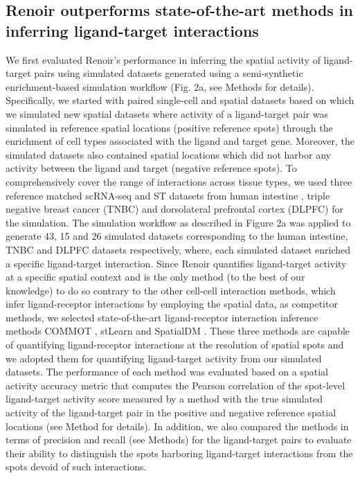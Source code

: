 \subsection*{Renoir outperforms state-of-the-art methods in inferring ligand-target interactions}
We first evaluated Renoir's performance in inferring the spatial activity of ligand-target pairs using simulated datasets generated using a semi-synthetic enrichment-based simulation workflow (Fig. 2a, see Methods for details). Specifically, we started with paired single-cell and spatial datasets based on which we simulated new spatial datasets where activity of a ligand-target pair was simulated in reference spatial locations (positive reference spots) through the enrichment of cell types associated with the ligand and target gene. Moreover, the simulated datasets also contained spatial locations which did not harbor any activity between the ligand and target (negative reference spots). To comprehensively cover the range of interactions across tissue types, we used three reference matched scRNA-seq and ST datasets from human intestine \citep{FAWKNERCORBETT2021810}, triple negative breast cancer (TNBC) \citep{Wu2021} and dorsolateral prefrontal cortex (DLPFC) \citep{Maynard2021} for the simulation. The simulation workflow as described in Figure 2a was applied to generate 43, 15 and 26 simulated datasets corresponding to the human intestine, TNBC and DLPFC datasets respectively, where, each simulated dataset enriched a specific ligand-target interaction. Since Renoir quantifies ligand-target activity at a specific spatial context and is the only method (to the best of our knowledge) to do so contrary to the other cell-cell interaction methods, which infer ligand-receptor interactions by employing the spatial data, as competitor methods, we selected state-of-the-art ligand-receptor interaction inference methods COMMOT \citep{Cang2023}, stLearn \citep{Pham2023} and SpatialDM \citep{Li2023}. These three methods are capable of quantifying ligand-receptor interactions at the resolution of spatial spots and we adopted them for quantifying ligand-target activity from our simulated datasets. The performance of each method was evaluated based on a spatial activity accuracy metric that computes the Pearson correlation of the spot-level ligand-target activity score measured by a method with the true simulated activity of the ligand-target pair in the positive and negative reference spatial locations (see Method for details). In addition, we also compared the methods in terms of precision and recall (see Methods) for the ligand-target pairs to evaluate their ability to distinguish the spots harboring ligand-target interactions from the spots devoid of such interactions.\par 

